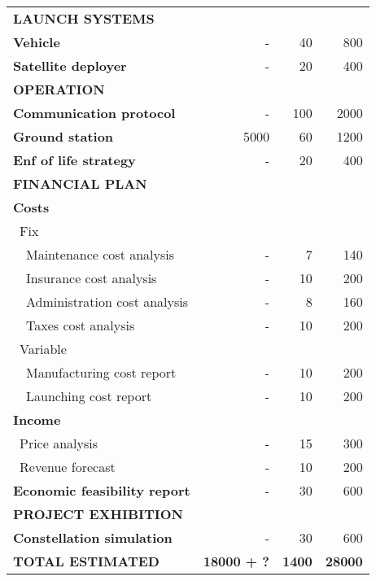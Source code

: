 \begin{longtable}{| l | r | r |r | }
\rowcolor[gray]{0.85} \textbf{LAUNCH SYSTEMS} & &  &   \\
	
	\textbf{Vehicle} & - & 40 & 800 \\
	\hline
	\textbf{Satellite deployer} & - & 20 & 400  \\

	
\rowcolor[gray]{0.85} \textbf{OPERATION} & &  &  \\
	
	\textbf{Communication protocol} & - & 100 & 2000 \\
	\hline
	\textbf{Ground station} & 5000 & 60 & 1200 \\
	\hline
	\textbf{Enf of life strategy} & - & 20  & 400 \\
	\hline

\pagebreak

	\hline
\rowcolor[gray]{0.85} \textbf{FINANCIAL PLAN} & &  & \\
	
	\textbf{Costs} & & & \\
	   \blue ~Fix & &  &   \\
	   ~~Maintenance cost analysis & - & 7 & 140 \\
	   ~~Insurance cost analysis & - & 10 & 200 \\
	   ~~Administration cost analysis & - & 8 & 160 \\
	   ~~Taxes cost analysis & - & 10 & 200 \\
	   \blue ~Variable & &  & \\
	   ~~Manufacturing cost report & - & 10 & 200 \\
	   ~~Launching cost report & - & 10 & 200 \\
	\hline
	\textbf{Income} & & &  \\
	   \blue ~Price analysis & - & 15  & 300  \\
	   \blue ~Revenue forecast & - & 10  & 200  \\
	\hline
	\textbf{Economic feasibility report} & - & 30 & 600 \\

\rowcolor[gray]{0.85} \textbf{PROJECT EXHIBITION} & & &  \\

	\textbf{Constellation simulation} & - & 30 & 600 \\

\rowcolor[gray]{0.65} \textbf{TOTAL ESTIMATED} & \textbf{18000 + ?} & \textbf{1400} & \textbf{28000} \\
    \hline

\end{longtable}